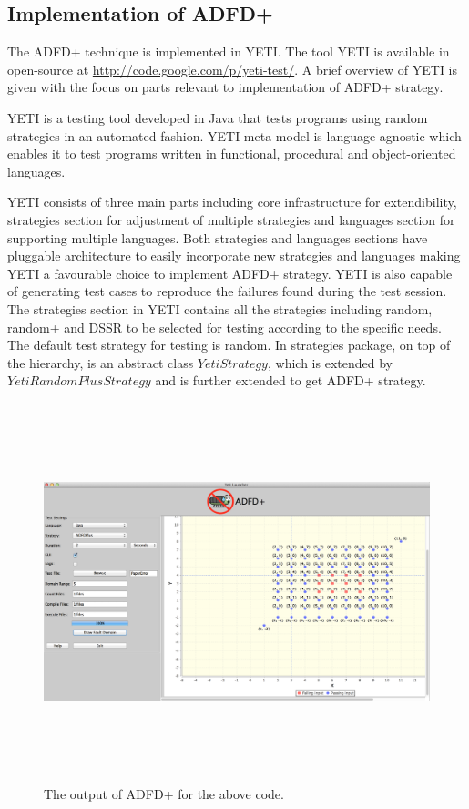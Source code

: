 \subsection{Implementation of ADFD+}\label{sec:intro6_4}
The ADFD+ technique is implemented in YETI. The tool YETI is available in open-source at \url{http://code.google.com/p/yeti-test/}. A brief overview of YETI is given with the focus on parts relevant to implementation of ADFD+ strategy.

YETI is a testing tool developed in Java that tests programs using random strategies in an automated fashion. YETI meta-model is language-agnostic which enables it to test 
programs written in functional, procedural and object-oriented languages. 

YETI consists of three main parts including core infrastructure for extendibility, strategies section for adjustment of multiple strategies and 
languages section for supporting multiple languages. Both strategies and languages sections have pluggable architecture to easily incorporate new strategies and 
languages making YETI a favourable choice to implement ADFD+ strategy. YETI is also capable of generating test cases to reproduce the failures found during the test session. 
The strategies section in YETI contains all the strategies including random, random+ and DSSR to be selected for testing according to the specific needs. The default test 
strategy for testing is random. In strategies package, on top of the hierarchy, is an abstract class $YetiStrategy$, which is extended by $YetiRandomPlusStrategy$ and is further extended to get ADFD+ strategy.

\begin{figure}[ht]
\centering
\includegraphics[width=15.5cm,height=11cm]{chapter6/exampleError.png}
\caption{The output of ADFD+ for the above code.}
\label{fig:adfdPlusExample}
\end{figure}

